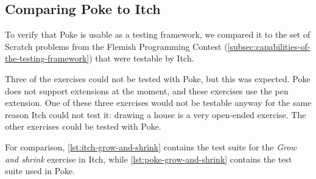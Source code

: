 \documentclass[../main]{subfiles}
\begin{document}
\subsection{Comparing Poke to Itch}\label{subsec:comparing-poke-to-itch}

To verify that Poke is usable as a testing framework, we compared it to the set of Scratch problems from the Flemish Programming Contest (\cref{subsec:capabilities-of-the-testing-framework}) that were testable by Itch.

Three of the exercises could not be tested with Poke, but this was expected.
Poke does not support extensions at the moment, and these exercises use the pen extension.
One of these three exercises would not be testable anyway for the same reason Itch could not test it: drawing a house is a very open-ended exercise.
The other exercises could be tested with Poke.

For comparison, \cref{lst:itch-grow-and-shrink} contains the test suite for the \emph{Grow and shrink} exercise in Itch, while \cref{lst:poke-grow-and-shrink} contains the test suite used in Poke.
\end{document}
